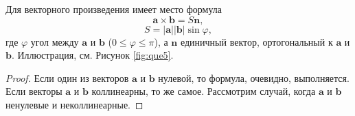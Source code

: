 \begin{theorem}
	Для векторного произведения имеет место формула 
	\begin{equation*}
		\mathbf{a} \times \mathbf{b} = S\mathbf{n},
	\end{equation*}
	\begin{equation*}
		S = |\mathbf{a}||\mathbf{b}|\sin{\varphi},
	\end{equation*}
	где $\varphi$ угол между $\mathbf{a}$ и $\mathbf{b}$ ($0\leqslant\varphi\leqslant\pi$), а $\mathbf{n}$ единичный вектор, ортогональный к $\mathbf{a}$ и $\mathbf{b}$. Иллюстрация, см. Рисунок \ref{fig:que5}.
	
	\begin{proof}
		Если один из векторов $\mathbf{a}$ и $\mathbf{b}$ нулевой, то формула, очевидно, выполняется. Если векторы $\mathbf{a}$ и $\mathbf{b}$ коллинеарны, то же самое. Рассмотрим случай, когда $\mathbf{a}$ и $\mathbf{b}$ ненулевые и неколлинеарные.
		

\end{proof}
\end{theorem}
